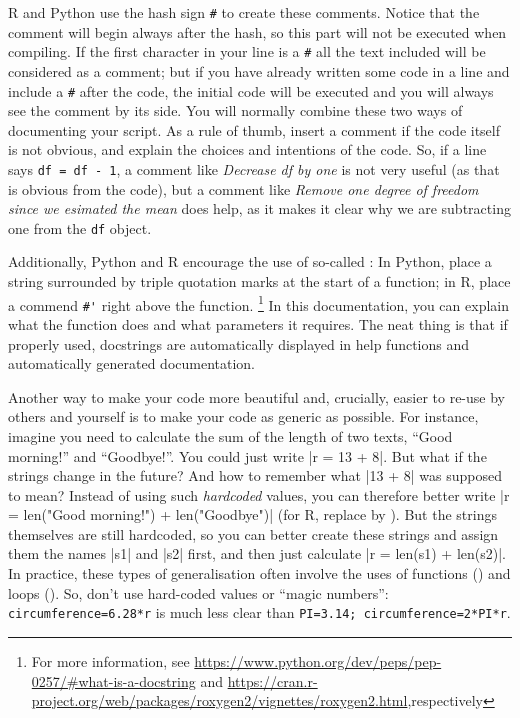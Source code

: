 R and Python use the hash sign \texttt{\#} to create these comments. Notice that the comment will begin always after the hash, so this part will not be executed when compiling. If the first character in your line is  a \texttt{\#} all the text included will be considered as a comment; but if you have already written some code in a line and include a \texttt{\#} after the code, the initial code will be executed and you will always see the comment by its side. You will normally combine these two ways of documenting your script.
As a rule of thumb, insert a comment if the code itself is not obvious,
and explain the choices and intentions of the code.
So, if a line says \verb|df = df - 1|, a comment like \emph{Decrease df by one} is not very useful (as that is obvious from the code), but a comment like \emph{Remove one degree of freedom since we esimated the mean} does help, as it makes it clear why we are subtracting one from the \verb|df| object.

Additionally, Python and R encourage the use of so-called :
In Python, place a string surrounded by triple quotation marks at the start of a function; in R, place a commend \verb|#'| right above the function.
\footnote{For more information, see \url{https://www.python.org/dev/peps/pep-0257/\#what-is-a-docstring} and \url{https://cran.r-project.org/web/packages/roxygen2/vignettes/roxygen2.html},respectively}
In this documentation, you can explain what the function does and what parameters it requires. 
The neat thing is that if properly used, docstrings are automatically displayed in help functions and automatically generated documentation.

Another way to make your code more beautiful and, crucially, easier to re-use by others and yourself is to make your code as generic as possible. For instance, imagine you need to calculate the sum of the length of two texts, ``Good morning!'' and ``Goodbye!''. You could just write |r = 13 + 8|. But what if the strings change in the future? And how to remember what |13 + 8| was supposed to mean? Instead of using such \emph{hardcoded} values, you can therefore better write |r = len("Good morning!") + len("Goodbye")| (for R, replace  by ). But the strings themselves are still hardcoded, so you can better create these strings and assign them the names |s1| and |s2| first, and then just calculate |r = len(s1) + len(s2)|. In practice, these types of generalisation often involve the uses of functions () and loops (). So, don't use hard-coded values or ``magic numbers'': \verb+circumference=6.28*r+ is much less clear than \verb+PI=3.14; circumference=2*PI*r+.

